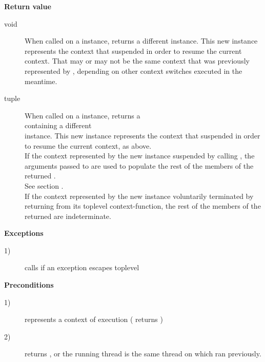 {\bfseries Return value}
\begin{description}
    \item[void]     When called on a \contvoid instance, \op returns
                    a different \contvoid instance. This new instance
                    represents the context that suspended in order to resume
                    the current context. That may or may not be the same
                    context that was previously represented by ,
                    depending on other context switches executed in the
                    meantime.
    \item[tuple]    When called on a \contargs instance, \op returns a\\
                    \contargstup containing a different\\
                    \contargs instance. This new instance represents the
                    context that suspended in order to resume the current
                    context, as above.\\
                    If the context represented by the new \contargs instance
                    suspended by calling \op, the arguments passed to \op are
                    used to populate the rest of the members of the
                    returned .\\
                    See section .\\
                    If the context represented by the new \contargs instance
                    voluntarily terminated by returning from its toplevel
                    context-function, the rest of the members of the
                    returned  are indeterminate.\\
\end{description}

{\bfseries Exceptions}
\begin{description}
    \item[1)] calls  if an exception escapes toplevel \\
\end{description}

{\bfseries Preconditions}
\begin{description}
    \item[1)]  represents a context of execution (\opbool
              returns )
    \item[2)]  returns , or the running thread is
              the same thread on which  ran previously.
\end{description}

